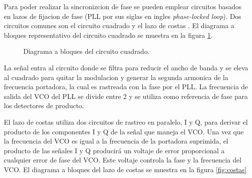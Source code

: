 Para poder realizar la sincronizcion de fase se pueden emplear circuitos basados en lazos de fijacion de fase (PLL por sus siglas
en ingles \emph{phase-locked loop}). Dos circuitos comunes son el circuito cuadrado y el lazo de costas \cite{perez}. El diagrama
a bloques representativo del circuito cuadrado se muestra en la figura \ref{fig:ccuad}.

\begin{figure}[htp]
\centering
    \vspace{0.3in}
    \caption{Diagrama a bloques del circuito cuadrado. \protect\cite{perez}}
    \label{fig:ccuad}
\end{figure}

La se\~nal entra al circuito donde se filtra para reducir el ancho de banda y se eleva al cuadrado para quitar la modulacion y
generar la segunda armonica de la frecuencia portadora, la cual es rastreada con la fase por el PLL. La frecuencia de salida del
VCO del PLL se divide entre 2 y se utiliza como referencia de fase para los detectores de producto.

El lazo de costas utiliza dos circuitos de rastreo en paralelo, I y Q, para derivar el producto de los componentes I y Q de la
se\~nal que maneja el VCO. Una vez que la frecuencia del VCO es igual a la frecuencia de la portadora suprimida, el producto de
las se\~nales I y Q producir\'a un voltaje de error proporcional a cualquier error de fase del VCO. Este voltaje controla la fase
y la frecuencia del VCO. El diagrama a bloques del lazo de costas se muestra en la figura \ref{fig:costas}

